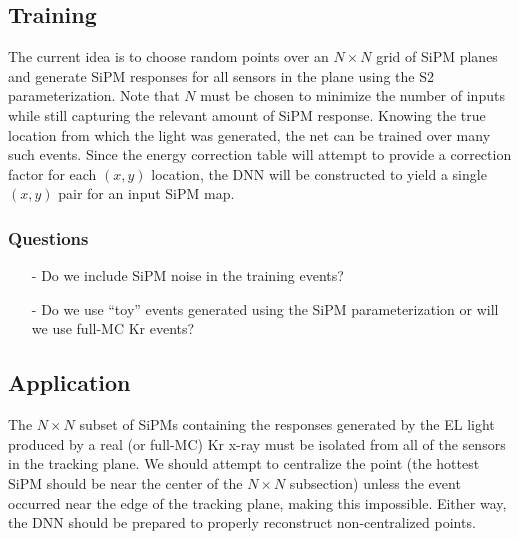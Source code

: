 \subsection{Training}
\noindent The current idea is to choose random points over an $N \times N$ grid of SiPM planes and generate SiPM responses for all sensors in the plane using the S2 parameterization.  Note that $N$ must be chosen to minimize the number of inputs while still capturing the relevant amount of SiPM response.  Knowing the true location from which the light was generated, the net can be trained over many such events.  Since the energy correction table will attempt to provide a correction factor for each $(x,y)$ location, the DNN will be constructed to yield a single $(x,y)$ pair for an input SiPM map.  

\subsubsection{Questions}
\begin{enumerate}
	\item[-] Do we include SiPM noise in the training events?
	\item[-] Do we use ``toy'' events generated using the SiPM parameterization or will we use full-MC Kr events?
\end{enumerate}

\subsection{Application}
\noindent The $N \times N$ subset of SiPMs containing the responses generated by the EL light produced by a real (or full-MC) Kr x-ray must be isolated from all of the sensors in the tracking plane.  We should attempt to centralize the point (the hottest SiPM should be near the center of the $N \times N$ subsection) unless the event occurred near the edge of the tracking plane, making this impossible.  Either way, the DNN should be prepared to properly reconstruct non-centralized points.
